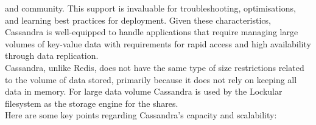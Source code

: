 \documentclass{tufte-handout}
\begin{document}
and community. This support is invaluable for troubleshooting, optimisations, and learning best practices for deployment.
Given these characteristics, Cassandra is well-equipped to handle applications that require managing large volumes of key-value data with
requirements for rapid access and high availability through data replication.\\
\vspace{10pt}
Cassandra, unlike Redis, does not have the same type of size restrictions related to the volume of data stored, primarily because it does
not rely on keeping all data in memory. For large data volume Cassandra is used by the Lockular filesystem as the storage engine for the shares.\\
\vspace{10pt}
Here are some key points regarding Cassandra's capacity and scalability:
\end{document}
